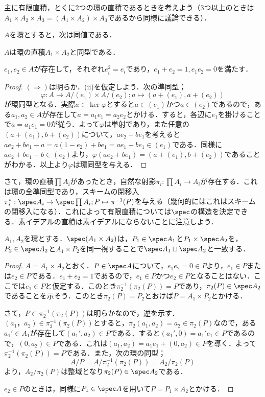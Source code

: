 主に有限直積，とくに2つの環の直積であるときを考えよう（3つ以上のときは$A_1\times A_2\times A_3=(A_1\times A_2)\times A_3$であるから同様に議論できる）．

\begin{prop}
	$A$を環とすると，次は同値である．
	\begin{sakura}
		\item $A$は環の直積$A_1\times A_2$と同型である．
		\item $e_1,e_2\in A$が存在して，それぞれ$e_i^2=e_i$であり，$e_1+e_2=1,e_1e_2=0$を満たす．
	\end{sakura}
\end{prop}

\begin{proof}
	$(\Longrightarrow)$は明らか．(ii)を仮定しよう．次の準同型；
	\[\varphi:A\to A/(e_1)\times A/(e_2);a\mapsto (a+(e_1),a+(e_2))\]
	が環同型となる．実際$a\in\ker\varphi$とすると$a\in (e_1)$かつ$a\in (e_2)$であるので，ある$a_1,a_2\in A$が存在して$a=a_1e_1=a_2e_2$とかける．すると，各辺に$e_1$を掛けることで$a=a_1e_1=0$が従う．よって$\varphi$は単射であり，また任意の$(a+(e_1),b+(e_2))$について，$ae_2+be_1$を考えると$ae_2+be_1-a=a(1-e_2)+be_1=ae_1+be_1\in (e_1)$である．同様に$ae_2+be_1-b\in (e_2)$より，$\varphi(ae_2+be_1)=(a+(e_1),b+(e_2))$であることがわかる．以上より$\varphi$は環同型を与える．
\end{proof}

さて，環の直積$\prod A_i$があったとき，自然な射影$\pi_i:\prod A_i\to A_i$が存在する．これは環の全準同型であり，スキームの閉移入$\pi_i^\ast:\spec A_i\to\spec\prod A_i;P\mapsto \pi^{-1}(P)$を与える（幾何的にはこれはスキームの閉移入になる）．これによって有限直積については$\spec$の構造を決定できる．素イデアルの直積は素イデアルにならないことに注意しよう．
\begin{prop}\label{prop:直積環のspec}
	$A_1,A_2$を環とする．$\spec (A_1\times A_2)$は，$P_1\in\spec A_1$と$P_1\times \spec A_2$を，$P_2\in\spec A_2$と$A_1\times P_2$を同一視することで$\spec A_1\sqcup\spec A_2$と一致する．
\end{prop}

\begin{proof}
	$A=A_1\times A_2$とおく．$P\in\spec A$について，$e_1e_2=0\in P$より，$e_1\in P$または$e_2\in P$である．$e_1+e_2=1$であるので，$e_1\in P$かつ$e_2\in P$となることはない．ここでは$e_1\in P$と仮定する．このとき$\pi_2^{-1}(\pi_2(P))=P$であり，$\pi_2(P)\in\spec A_2$であることを示そう．このとき$\pi_2(P)=P_2$とおけば$P=A_1\times P_2$とかける．
	
	さて，$P\subset\pi_2^{-1}(\pi_2(P))$は明らかなので，逆を示す．$(a_1，a_2)
	\in\pi_2^{-1}(\pi_2(P))$とすると，$\pi_2(a_1,a_2)=a_2\in\pi_2(P)$なので，ある$a_1'\in A_1$が存在して$(a_1',a_2)\in P$である．すると$(a_1',0)=a_1'e_1\in P$であるので，$(0,a_2)\in P$である．これは$(a_1,a_2)=a_1e_1+(0,a_2)\in P$を導く．よって$\pi_2^{-1}(\pi_2(P))=P$である．また，次の環の同型；
	\[A/P=A/\pi_2^{-1}(\pi_2(P))=A_2/\pi_2(P)\]
	より，$A_2/\pi_2(P)$は整域となり$\pi_2(P)\in\spec A_2$である．
	
	$e_2\in P$のときは，同様に$P_1\in\spec A$を用いて$P=P_1\times A_2$とかける．
\end{proof}

